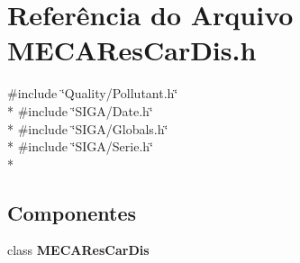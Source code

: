 \section{Referência do Arquivo M\+E\+C\+A\+Res\+Car\+Dis.\+h}
\label{_m_e_c_a_res_car_dis_8h}
{\ttfamily \#include \char`\"{}Quality/\+Pollutant.\+h\char`\"{}}\\*
{\ttfamily \#include \char`\"{}S\+I\+G\+A/\+Date.\+h\char`\"{}}\\*
{\ttfamily \#include \char`\"{}S\+I\+G\+A/\+Globals.\+h\char`\"{}}\\*
{\ttfamily \#include \char`\"{}S\+I\+G\+A/\+Serie.\+h\char`\"{}}\\*
\subsection*{Componentes}
\begin{DoxyCompactItemize}
\item 
class {\bf M\+E\+C\+A\+Res\+Car\+Dis}
\end{DoxyCompactItemize}
